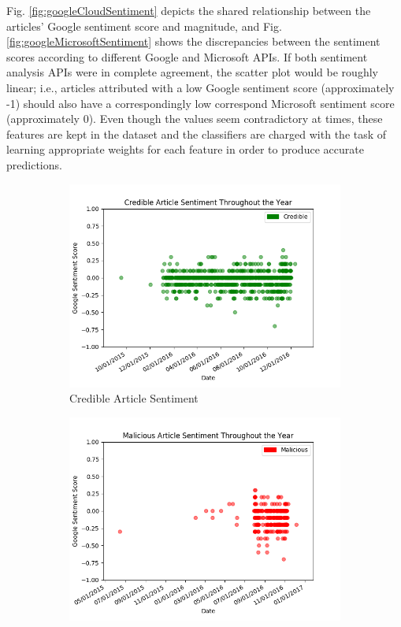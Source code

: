 Fig. \ref{fig:googleCloudSentiment} depicts the shared relationship between the articles' Google sentiment score and magnitude, and Fig. \ref{fig:googleMicrosoftSentiment} shows the discrepancies between the sentiment scores according to different Google and Microsoft APIs.  If both sentiment analysis APIs were in complete agreement, the scatter plot would be roughly linear; i.e., articles attributed with a low Google sentiment score (approximately -1) should also have a correspondingly low correspond Microsoft sentiment score (approximately 0).  Even though the values seem contradictory at times, these features are kept in the dataset and the classifiers are charged with the task of learning appropriate weights for each feature in order to produce accurate predictions.


\begin{figure}
\centering
\captionsetup{justification=centering,width=0.95\textwidth}
    \begin{subfigure}[h]{0.5\textwidth}
            \centering
            \includegraphics[width=\linewidth]{credibleSentimentThruYear.png}
            \caption{Credible Article Sentiment}
            \label{fig:credibleSentimentThruYear}
    \end{subfigure}\hfill
    \begin{subfigure}[h]{0.5\textwidth}
            \centering
            \includegraphics[width=\linewidth]{maliciousSentimentThruYear.png}

\end{subfigure}
\end{figure}
